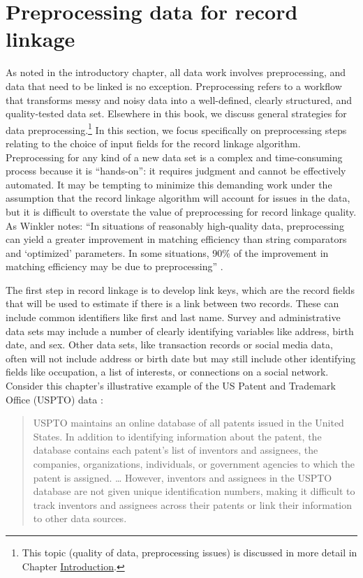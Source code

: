 \documentclass[]{krantz}
\begin{document}
\section{Preprocessing data for record
linkage}\label{preprocessing-data-for-record-linkage}

As noted in the introductory chapter, all data work involves
preprocessing, and data that need to be linked is no exception.
Preprocessing refers to a workflow that transforms messy and noisy data
into a well-defined, clearly structured, and quality-tested data set.
Elsewhere in this book, we discuss general strategies for data
preprocessing.\footnote{This topic (quality of data, preprocessing
  issues) is discussed in more detail in Chapter
  \protect\hyperlink{chap:intro}{Introduction}.} In this section, we
focus specifically on preprocessing steps relating to the choice of
input fields for the record linkage algorithm. Preprocessing for any
kind of a new data set is a complex and time-consuming process because
it is ``hands-on'': it requires judgment and cannot be effectively
automated. It may be tempting to minimize this demanding work under the
assumption that the record linkage algorithm will account for issues in
the data, but it is difficult to overstate the value of preprocessing
for record linkage quality. As Winkler notes: ``In situations of
reasonably high-quality data, preprocessing can yield a greater
improvement in matching efficiency than string comparators and
`optimized' parameters. In some situations, 90\% of the improvement in
matching efficiency may be due to preprocessing'' \citep{winkler09}.

The first step in record linkage is to develop link keys, which are the
record fields that will be used to estimate if there is a link between
two records. These can include common identifiers like first and last
name. Survey and administrative data sets may include a number of
clearly identifying variables like address, birth date, and sex. Other
data sets, like transaction records or social media data, often will not
include address or birth date but may still include other identifying
fields like occupation, a list of interests, or connections on a social
network. Consider this chapter's illustrative example of the US Patent
and Trademark Office (USPTO) data \citep{ventura2015seeing}:

\begin{quote}
USPTO maintains an online database of all patents issued in the United
States. In addition to identifying information about the patent, the
database contains each patent's list of inventors and assignees, the
companies, organizations, individuals, or government agencies to which
the patent is assigned. \ldots{} However, inventors and assignees in the
USPTO database are not given unique identification numbers, making it
difficult to track inventors and assignees across their patents or link
their information to other data sources.
\end{quote}
\end{document}
